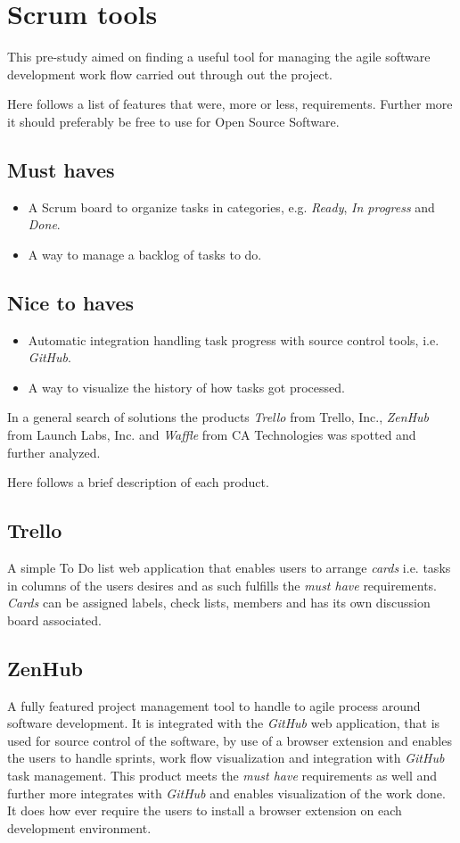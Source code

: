 \section{Scrum tools}
This pre-study aimed on finding a useful tool for managing the agile software development work flow carried out through out the project.

Here follows a list of features that were, more or less, requirements. Further more it should preferably be free to use for Open Source Software.

\subsection*{Must haves}
\begin{itemize}
\item A Scrum board to organize tasks in categories, e.g. \textit{Ready}, \textit{In progress} and \textit{Done}.
\item A way to manage a backlog of tasks to do.
\end{itemize}

\subsection*{Nice to haves}
\begin{itemize}
\item Automatic integration handling task progress with source control tools, i.e. \textit{GitHub}.
\item A way to visualize the history of how tasks got processed.
\end{itemize}

In a general search of solutions the products \textit{Trello} from Trello, Inc., \textit{ZenHub} from Launch Labs, Inc. and \textit{Waffle} from CA Technologies was spotted and further analyzed.

Here follows a brief description of each product.

\subsection*{Trello}
A simple To Do list web application that enables users to arrange \textit{cards} i.e. tasks in columns of the users desires and as such fulfills the \textit{must have} requirements.
\textit{Cards} can be assigned labels, check lists, members and has its own discussion board associated.

\subsection*{ZenHub}
A fully featured project management tool to handle to agile process around software development. 
It is integrated with the \textit{GitHub} web application, that is used for source control of the software, by use of a browser extension and enables the users to handle sprints, work flow visualization and integration with \textit{GitHub} task management. 
This product meets the \textit{must have} requirements as well and further more integrates with \textit{GitHub} and enables visualization of the work done.
It does how ever require the users to install a browser extension on each development environment.

